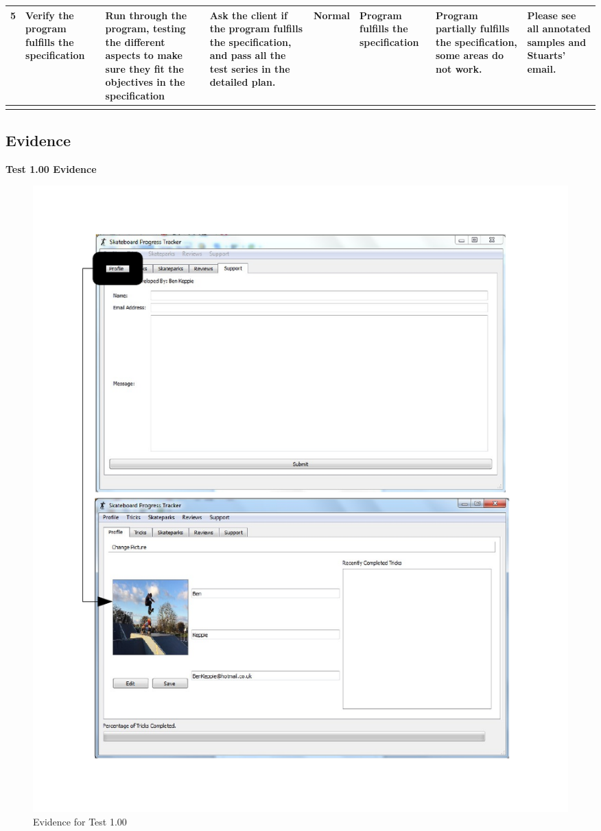 \begin{landscape}
\begin{center}
\begin{longtable}{|p{1.5cm}|p{2.5cm}|p{2.5cm}|p{2cm}|p{2cm}|p{2cm}|p{2cm}|p{2cm}|}
5 & Verify the program fulfills the specification & Run through the program, testing the different aspects to make sure they fit the objectives in the specification & Ask the client if the program fulfills the specification, and pass all the test series in the detailed plan. & Normal & Program fulfills the specification & \textbf{Program partially fulfills the specification, some areas do not work.} & Please see all annotated samples and Stuarts' email. \\ \hline

\label{tab:Testing}

	\end{longtable}

\end{center}
\end{landscape}


\subsection{Evidence}

\textbf{Test 1.00 Evidence}

\begin{figure}[H]
    \includegraphics[width=\textwidth]{./Testing/AnnotatedSamples/Test100.pdf}
    \caption{Evidence for Test 1.00} \label{fig:Test 1.00}
\end{figure}

